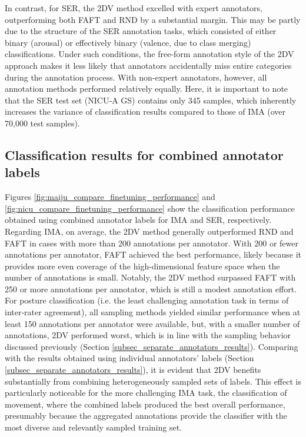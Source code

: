 \documentclass[a4paper,fleqn]{cas-dc}
\begin{document}
In contrast, for SER, the 2DV method excelled with expert annotators, outperforming both FAFT and RND by a substantial margin. This may be partly due to the structure of the SER annotation tasks, which consisted of either binary (arousal) or effectively binary (valence, due to class merging) classifications. Under such conditions, the free-form annotation style of the 2DV approach makes it less likely that annotators accidentally miss entire categories during the annotation process. With non-expert annotators, however, all annotation methods performed relatively equally. Here, it is important to note that the SER test set (NICU‑A GS) contains only 345 samples, which inherently increases the variance of classification results compared to those of IMA (over 70,000 test samples).

\subsection{Classification results for combined annotator labels} \label{subsec_combined_annotators_results}

Figures \ref{fig:maiju_compare_finetuning_performance} and \ref{fig:nicu_compare_finetuning_performance} show the classification performance obtained using combined annotator labels for IMA and SER, respectively. Regarding IMA, on average, the 2DV method generally outperformed RND and FAFT in cases with more than 200 annotations per annotator. With 200 or fewer annotations per annotator, FAFT achieved the best performance, likely because it provides more even coverage of the high-dimensional feature space when the number of annotations is small. Notably, the 2DV method surpassed FAFT with 250 or more annotations per annotator, which is still a modest annotation effort. For posture classification (i.e. the least challenging annotation task in terms of inter‑rater agreement), all sampling methods yielded similar performance when at least 150 annotations per annotator were available, but, with a smaller number of annotations, 2DV performed worst, which is in line with the sampling behavior discussed previously (Section \ref{subsec_separate_annotators_results}). Comparing with the results obtained using individual annotators' labels (Section \ref{subsec_separate_annotators_results}), it is evident that 2DV benefits substantially from combining heterogeneously sampled sets of labels. This effect is particularly noticeable for the more challenging IMA task, the classification of movement, where the combined labels produced the best overall performance, presumably because the aggregated annotations provide the classifier with the most diverse and relevantly sampled training set.
\end{document}
